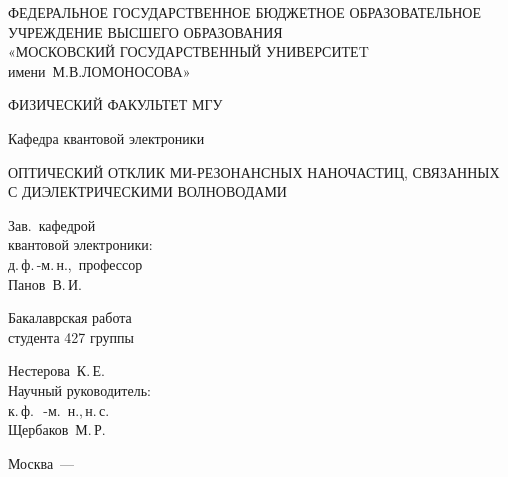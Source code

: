 \begin{titlepage} 

	{
		\centering
		\normalsize
					
		ФЕДЕРАЛЬНОЕ ГОСУДАРСТВЕННОЕ БЮДЖЕТНОЕ ОБРАЗОВАТЕЛЬНОЕ\\ 
		УЧРЕЖДЕНИЕ ВЫСШЕГО ОБРАЗОВАНИЯ\\ 
		«МОСКОВСКИЙ ГОСУДАРСТВЕННЫЙ УНИВЕРСИТЕT\\ 
		имени~М.В.ЛОМОНОСОВА»
			
		\vspace{0.4 cm} 
			
		\uppercase{Физический факультет МГУ}
			
		\vspace{0.2 cm} 
			
		Кафедра квантовой электроники
		
		\par
	} 
	
	\vspace{4 cm} 
	
	{
		\centering
		\Large
		\uppercase{
			Оптический отклик Ми-резонансных наночастиц, связанных с диэлектрическими волноводами	
		}
		 
		\par
	} 
	
	\vspace{4 cm} 
	
	{
		\begin{minipage}{0.5\textwidth}
		
			\begin{flushleft}
				Зав.~кафедрой\\ 
				квантовой электроники:\\ 
				д.\,ф.\,-м.\,н.,~профессор\\ 
				Панов~В.\,И.
			\end{flushleft}	
			
		\end{minipage}
		\begin{minipage}{0.5\textwidth}
		
			\begin{flushright}
				Бакалаврская работа\\ 
				студента 427 группы\\ 
			
				\vspace{0.3 cm}
			
				Нестерова~К.\,Е.\\ 
				Научный руководитель: \\ 
				к.\,ф.\,~-м.\ н.,\,н.\,с.\\ 

				Щербаков~М.\,Р.
			\end{flushright}
			
		\end{minipage}
	} 
	
	\vfill 
	
	\centerline{Москва~— \the\year} 
	
\end{titlepage} 

\setcounter{page}{2}
\newpage